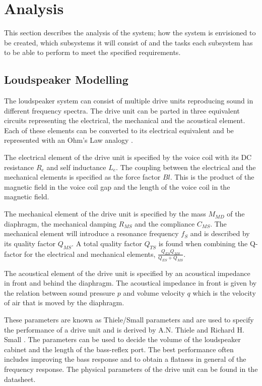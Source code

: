 
\chapter{Analysis}
This section describes the analysis of the system; how the system is envisioned to be created, which subsystems it will consist of and the tasks each subsystem has to be able to perform to meet the specified requirements.

\section{Loudspeaker Modelling}
The loudspeaker system can consist of multiple drive units reproducing sound in different frequency spectra.
The drive unit can be parted in three equivalent circuits representing the electrical, the mechanical and the acoustical element. 
Each of these elements can be converted to its electrical equivalent and be represented with an Ohm's Law analogy \cite[p.~115]{Elektroakustik}.

The electrical element of the drive unit is specified by the voice coil with its DC resistance $R_e$ and self inductance $L_e$. 
The coupling between the electrical and the mechanical elements is specified as the force factor $Bl$. 
This is the product of the magnetic field in the voice coil gap and the length of the voice coil in the magnetic field. \cite[p.~34]{Elektroakustik}

The mechanical element of the drive unit is specified by the mass $M_{MD}$ of the diaphragm, the mechanical damping $R_{MS}$ and the compliance $C_{MS}$. 
The mechanical element will introduce a resonance frequency $f_S$ and is described by its quality factor $Q_{MS}$. 
A total quality factor $Q_{TS}$ is found when combining the Q-factor for the electrical and mechanical elements, $\frac{Q_{ES}Q_{MS}}{Q_{ES}+Q_{MS}}$.

The acoustical element of the drive unit is specified by an acoustical impedance in front and behind the diaphragm. 
The acoustical impedance in front is given by the relation between sound pressure $p$ and volume velocity $q$ which is the velocity of air that is moved by the diaphragm. 

These parameters are known as Thiele/Small parameters and are used to specify the performance of a drive unit and is derived by A.N. Thiele \cite{thiele1971loudspeakers} and Richard H. Small \cite{small1972closed}.
The parameters can be used to decide the volume of the loudspeaker cabinet and the length of the bass-reflex port. 
The best performance often includes improving the bass response and to obtain a flatness in general of the frequency response. 
The physical parameters of the drive unit can be found in the datasheet.

